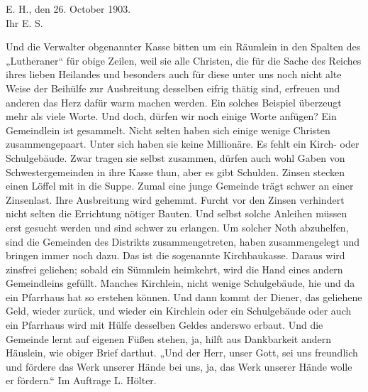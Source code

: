 \begin{unterschrift}
E. H., den 26. October 1903.\\
Ihr E. S.
\end{unterschrift}

Und die Verwalter obgenannter Kasse bitten um ein Räumlein in den Spalten des „Lutheraner“ für obige Zeilen, weil sie alle Christen, die für die Sache des Reiches ihres lieben Heilandes und besonders auch für diese unter uns noch nicht alte Weise der Beihülfe zur Ausbreitung desselben eifrig thätig sind, erfreuen und anderen das Herz dafür warm machen werden. Ein solches Beispiel überzeugt mehr als viele Worte. Und doch, dürfen wir noch einige Worte anfügen? Ein Gemeindlein ist gesammelt. Nicht selten haben sich einige wenige Christen zusammengepaart. Unter sich haben sie keine Millionäre. Es fehlt ein Kirch- oder Schulgebäude. Zwar tragen sie selbst zusammen, dürfen auch wohl Gaben von Schwestergemeinden in ihre Kasse thun, aber es gibt Schulden. Zinsen stecken einen Löffel mit in die Suppe. Zumal eine junge Gemeinde trägt schwer an einer Zinsenlast. Ihre Ausbreitung wird gehemmt. Furcht vor den Zinsen verhindert nicht selten die Errichtung nötiger Bauten. Und selbst solche Anleihen müssen erst gesucht werden und sind schwer zu erlangen. Um solcher Noth abzuhelfen, sind die Gemeinden des Distrikts zusammengetreten, haben zusammengelegt und bringen immer noch dazu. Das ist die sogenannte Kirchbaukasse. Daraus wird zinsfrei geliehen; sobald ein Sümmlein heimkehrt, wird die Hand eines andern Gemeindleins gefüllt. Manches Kirchlein, nicht wenige Schulgebäude, hie und da ein Pfarrhaus hat so erstehen können. Und dann kommt der Diener, das geliehene Geld, wieder zurück, und wieder ein Kirchlein oder ein Schulgebäude oder auch ein Pfarrhaus wird mit Hülfe desselben Geldes anderswo erbaut. Und die Gemeinde lernt auf eigenen Füßen stehen, ja, hilft aus Dankbarkeit andern Häuslein, wie obiger Brief darthut. „Und der Herr, unser Gott, sei uns freundlich und fördere das Werk unserer Hände bei uns, ja, das Werk unserer Hände wolle er fördern.“ Im Auftrage L. Hölter.
